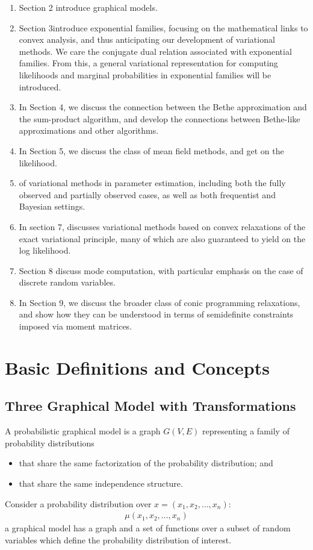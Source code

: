 \documentclass{article}
\begin{document}
\begin{enumerate}
    \item Section 2 introduce graphical models.
    \item Section 3introduce exponential families, focusing on the mathematical links to convex analysis, and thus anticipating our development of variational methods. We care the conjugate dual relation associated with exponential families. From this, a general variational representation for computing likelihoods and marginal probabilities in exponential families will be introduced.
    \item In Section 4, we discuss the connection between the Bethe approximation and the sum-product algorithm, and develop the connections between Bethe-like approximations and other algorithms.
    \item In Section 5, we discuss the class of mean field methods, and get  on the likelihood.
    \item of variational methods in parameter estimation, including both the fully observed and partially observed cases, as well as both frequentist and Bayesian settings.
    \item In section 7, discusses variational methods based on convex relaxations of the exact variational principle, many of which are also guaranteed to yield  on the log likelihood.
    \item Section 8 discuss mode computation, with particular emphasis on the case of discrete random variables.
    \item In Section 9, we discuss the broader class of conic programming relaxations, and show how they can be understood in terms of semidefinite constraints imposed via moment matrices.
\end{enumerate}

\section{Basic Definitions and Concepts}

\subsection{Three Graphical Model with Transformations}
A probabilistic graphical model is a graph $G(V, E)$ representing a family of probability distributions
\begin{itemize}
    \item that share the same factorization of the probability distribution; and
    \item that share the same independence structure.
\end{itemize}
Consider a probability distribution over $x=\left(x_{1}, x_{2}, \ldots, x_{n}\right)$:
\begin{align*}
\mu\left(x_{1}, x_{2}, \ldots, x_{n}\right)
\end{align*}
a graphical model has a graph and a set of functions over a subset of random variables which define the probability distribution of interest.
\end{document}
